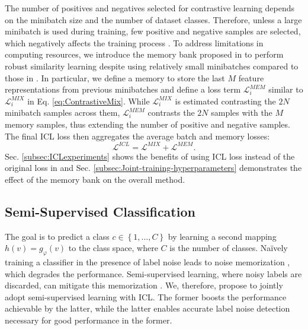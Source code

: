 \documentclass[final]{cvpr}
\begin{document}
The number of positives and negatives selected for contrastive learning depends on the minibatch size and the number of dataset classes. Therefore, unless a large minibatch is used during training, few positive and negative samples are selected, which negatively affects the training process \cite{2020_arXiv_SupContLearn}. To address limitations in computing resources, we introduce the memory bank proposed in \cite{2020_CVPR_XBM} to perform robust similarity learning despite using relatively small minibatches compared to those in \cite{2020_arXiv_SupContLearn}. In particular, we define a memory to store the last $M$ feature representations from previous minibatches and define a loss term $\mathcal{L}_{i}^{\mathit{MEM}}$ similar to $\mathcal{L}_{i}^{\mathit{MIX}}$ in Eq. \ref{eq:ContrastiveMix}. While $\mathcal{L}_{i}^{\mathit{MIX}}$ is estimated contrasting the $2N$ minibatch samples across them, $\mathcal{L}_{i}^{\mathit{MEM}}$ contrasts the $2N$ samples with the $M$ memory samples, thus extending the number of positive and negative samples. The final ICL loss then aggregates the average batch and memory losses:
\begin{equation}
\mathcal{L}^{\mathit{ICL}}=\mathcal{L}^{\mathit{MIX}}+\mathcal{L}^{\mathit{MEM}}.
\end{equation}
Sec. \ref{subsec:ICLexperiments} shows the benefits of using ICL loss instead of the original loss in \cite{2020_arXiv_SupContLearn} and Sec. \ref{subsec:Joint-training-hyperparameters} demonstrates the effect of the memory bank on the overall method.

\subsection{Semi-Supervised Classification\label{subsec:Semi-Supervised-Classification}}

The goal is to predict a class $c\in\left\{ 1,\ldots,C\right\} $ by learning a second mapping $h(v)=g_{\varphi}\left(v\right)$ to the class space, where $C$ is the number of classes. Na\"ively training a classifier in the presence of label noise leads to noise memorization \cite{2017_ICML_Memorization,2017_ICLR_Rethinking}, which degrades the performance.
Semi-supervised learning, where noisy labels are discarded, can mitigate this memorization \cite{2018_WACV_SemiSupNoise,2020_ICLR_DivideMix,2020_ICPR_SSLnoise}. We, therefore, propose to jointly adopt semi-supervised learning with ICL. The former boosts the performance achievable by the latter, while the latter enables accurate label noise detection necessary for good performance in the former.
\end{document}
